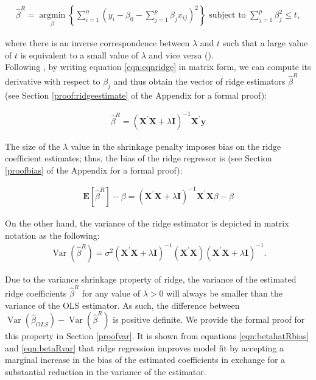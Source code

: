 \begin{align}
\label{eqn:eqn3}
\hat{\beta}^{R} = \underset{\beta}{\operatorname{argmin}}\left\{\sum_{i=1}^{n}\left(y_{i}-\beta_{0}-\sum_{j=1}^{p} \beta_{j} x_{i j}\right)^{2}\right\} \text { subject to } \sum_{j=1}^{p}\beta_{j}^{2} \leq t,
\end{align}

\noindent where there is an inverse correspondence between $\lambda$ and $t$ such that a large value of $t$ is equivalent to a small value of $\lambda$ and vice versa (\cite{hastie2008elements}).  \\

\noindent Following \cite{van2015lecture}, by writing equation \eqref{eqn:eqnridge} in matrix form, we can compute its derivative with respect to $\beta_{j}$ and thus obtain the vector of ridge estimators $\hat{\beta}^{R}$ (see Section \ref{proof:ridgeestimate} of the Appendix for a formal proof): 

\begin{align}
\label{eqn:betahatR}
\hat{\beta}^{R}=\left(\mathbf{X}^{\prime} \mathbf{X}+\lambda \mathbf{I}\right)^{-1} \mathbf{X}^{\prime} \mathbf{y} 
\end{align}

\noindent The size of the $\lambda$ value in the shrinkage penalty imposes bias on the ridge coefficient estimates; thus, the bias of the ridge regressor is (see Section \ref{proofbias} of the Appendix for a formal proof):

\begin{align}
\label{eqn:betahatRbias}
\mathbf{E}\left[\hat{\beta}^{R}\right] - \beta=\left(\mathbf{X}^{\prime} \mathbf{X}+\lambda \mathbf{I}\right)^{-1} \mathbf{X}^{\prime} \mathbf{X} \beta - \beta
\end{align}


\noindent On the other hand, the variance of the ridge estimator is depicted in matrix notation as the following:
\begin{align}
\label{eqn:betaRvar}
\operatorname{Var}\left(\hat{\beta}^{R} \right)=\sigma^2\left(\mathbf{X}^{\prime} \mathbf{X}+\lambda \mathbf{I}\right)^{-1}(\mathbf{X}^{\prime} \mathbf{X})\left(\mathbf{X}^{\prime} \mathbf{X}+\lambda \mathbf{I}\right)^{-1}.
\end{align}

\noindent Due to the variance shrinkage property of ridge, the variance of the estimated ridge coefficients $\hat{\beta}^{R}$ for any value of $\lambda > 0$ will always be smaller than the variance of the OLS estimator. As such, the difference between $\operatorname{Var}\left(\hat{\beta}_{OLS} \right) -\operatorname{Var}\left(\hat{\beta}^{R} \right)$ is positive definite. We provide the formal proof for this property in Section \ref{proofvar}. It is shown from equations \eqref{eqn:betahatRbias} and \eqref{eqn:betaRvar} that ridge regression improves model fit by accepting a marginal increase in the bias of the estimated coefficients in exchange for a substantial reduction in the variance of the estimator. \\

